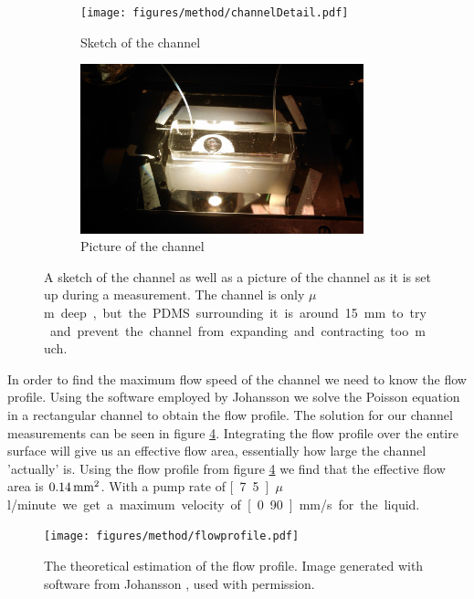 \begin{figure}[H]
\centering
\begin{subfigure}[b]{0.45\textwidth}
\texttt{[image: figures/method/channelDetail.pdf]}
\caption{Sketch of the channel}\label{fig:channelsketch}
\end{subfigure}
\begin{subfigure}[b]{0.45\textwidth}
\includegraphics[width=0.9\textwidth]{figures/method/ChannelZoomed.jpg}
\caption{Picture of the channel}\label{fig:channelpicture}
\end{subfigure}
\caption{A sketch of the channel as well as a picture of the channel as it is set up during a measurement. The channel is only \unit[150]{$\mu$m} deep, but the PDMS surrounding it is around 15 mm to try and prevent the channel from expanding and contracting too much.}
\label{fig:channel}
\end{figure}

In order to find the maximum flow speed of the channel we need to know the flow profile. Using the software employed by Johansson \cite{AntonThesis} we solve the Poisson equation in a rectangular channel to obtain the flow profile. The solution for our channel measurements can be seen in figure \ref{fig:flowprofile}. Integrating 
the flow profile over the entire surface will give us an effective flow area, essentially how large the channel 'actually' is. 
Using the flow profile from figure \ref{fig:flowprofile} we find that the effective flow area is $\unit[0.14]{mm^2}$. With a pump rate of \unit[7.5]{$\mu$l/minute} we get a maximum velocity of \unit[0.90]{mm/s} for the liquid.



\begin{figure}[H]
\begin{center}
\texttt{[image: figures/method/flowprofile.pdf]}
\end{center}
\caption{The theoretical estimation of the flow profile. Image generated with software from Johansson \cite{AntonThesis}, used with permission.}
\label{fig:flowprofile}
\end{figure}

